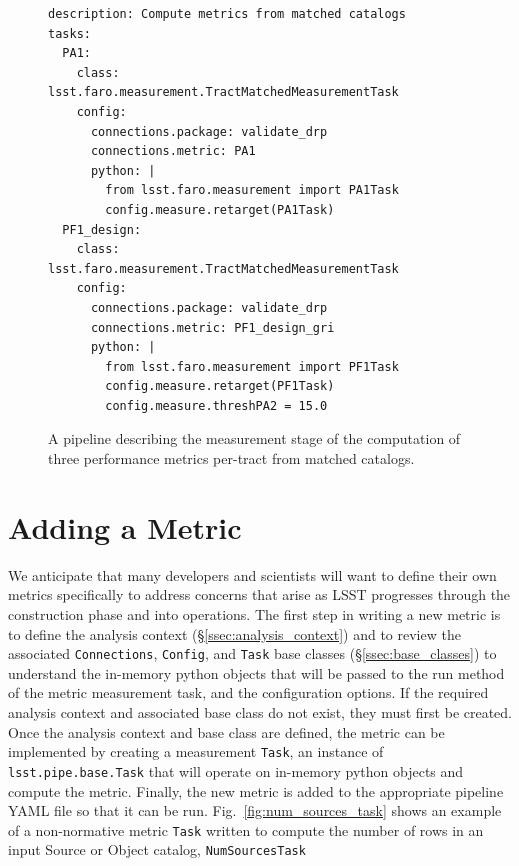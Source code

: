 \begin{figure}[ht]
  \begin{center}
  \lstset{language=YAML}
  \begin{lstlisting}
description: Compute metrics from matched catalogs
tasks:
  PA1:
    class: lsst.faro.measurement.TractMatchedMeasurementTask
    config:
      connections.package: validate_drp
      connections.metric: PA1
      python: |
        from lsst.faro.measurement import PA1Task
        config.measure.retarget(PA1Task)
  PF1_design:
    class: lsst.faro.measurement.TractMatchedMeasurementTask
    config:
      connections.package: validate_drp
      connections.metric: PF1_design_gri
      python: |
        from lsst.faro.measurement import PF1Task
        config.measure.retarget(PF1Task)
        config.measure.threshPA2 = 15.0
    \end{lstlisting}
    \end{center}
  \caption{\label{fig:faro_pipeline} 
  A \faro pipeline describing the measurement stage of the computation of three performance metrics per-tract from matched catalogs.}
\end{figure}

\section{Adding a  Metric} \label{sec:add}

We anticipate that many developers and scientists will want to define their own metrics specifically to address concerns that arise as LSST progresses through the construction phase and into operations.
The first step in writing a new metric is to define the analysis context (\S \ref{ssec:analysis_context}) and to review the associated \texttt{Connections}, \texttt{Config}, and \texttt{Task} base classes (\S \ref{ssec:base_classes}) to understand the in-memory python objects that will be passed to the run method of the metric measurement task, and the configuration options.
If the required analysis context and associated base class do not exist, they must first be created. 
Once the analysis context and base class are defined, the metric can be implemented by creating a measurement \texttt{Task}, an instance of \texttt{lsst.pipe.base.Task} that will operate on in-memory python objects and compute the metric. 
Finally, the new metric is added to the appropriate pipeline YAML file so that it can be run.
Fig.~\ref{fig:num_sources_task} shows an example of a non-normative metric \texttt{Task} written to compute the number of rows in an input Source or Object catalog, \texttt{NumSourcesTask}

